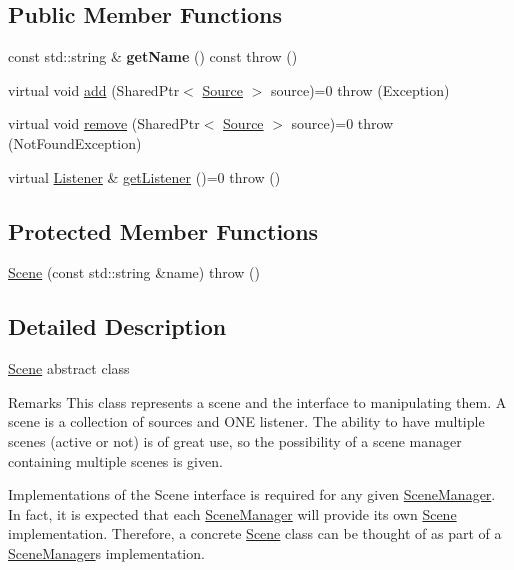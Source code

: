 \subsection*{Public Member Functions}
\begin{DoxyCompactItemize}
\item 
const std\+::string \& {\bfseries get\+Name} () const   throw ()\hypertarget{classAudio_1_1Scene_a6f612e2e868fbd8801a9f4f10f3ed7c5}{}\label{classAudio_1_1Scene_a6f612e2e868fbd8801a9f4f10f3ed7c5}

\item 
virtual void \hyperlink{classAudio_1_1Scene_a4d817ae609f031863c5446996652e497}{add} (Shared\+Ptr$<$ \hyperlink{classAudio_1_1Source}{Source} $>$ source)=0  throw (\+Exception)
\item 
virtual void \hyperlink{classAudio_1_1Scene_a725110194b195ab9260e16ca187c22ac}{remove} (Shared\+Ptr$<$ \hyperlink{classAudio_1_1Source}{Source} $>$ source)=0  throw (\+Not\+Found\+Exception)
\item 
virtual \hyperlink{classAudio_1_1Listener}{Listener} \& \hyperlink{classAudio_1_1Scene_a08c4d937457cc40a83ceb7b4cff3dd0a}{get\+Listener} ()=0  throw ()
\end{DoxyCompactItemize}
\subsection*{Protected Member Functions}
\begin{DoxyCompactItemize}
\item 
\hyperlink{classAudio_1_1Scene_a4ee0e1a5d3b28c2c5a4d442818224fae}{Scene} (const std\+::string \&name)  throw ()
\end{DoxyCompactItemize}


\subsection{Detailed Description}
\hyperlink{classAudio_1_1Scene}{Scene} abstract class

\begin{DoxyRemark}{Remarks}
This class represents a scene and the interface to manipulating them. A scene is a collection of sources and O\+NE listener. The ability to have multiple scenes (active or not) is of great use, so the possibility of a scene manager containing multiple scenes is given. 
\end{DoxyRemark}
\begin{DoxyParagraph}{Implementations of the Scene interface is required for any given}
\hyperlink{classAudio_1_1SceneManager}{Scene\+Manager}. In fact, it is expected that each \hyperlink{classAudio_1_1SceneManager}{Scene\+Manager} will provide its own \hyperlink{classAudio_1_1Scene}{Scene} implementation. Therefore, a concrete \hyperlink{classAudio_1_1Scene}{Scene} class can be thought of as part of a \hyperlink{classAudio_1_1SceneManager}{Scene\+Manager}\textquotesingle{}s implementation. 
\end{DoxyParagraph}



